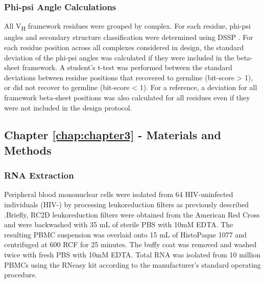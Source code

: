 \subsubsection{Phi-psi Angle Calculations}
All V\textsubscript{H} framework residues were grouped by complex. For each residue, phi-psi angles and secondary structure classification were determined using DSSP \citep{Kabsch:1983bp}. For each residue position across all complexes considered in design, the standard deviation of the phi-psi angles was calculated if they were included in the beta-sheet framework. A student's t-test was performed between the standard deviations between residue positions that recovered to germline (bit-score > 1), or did not recover to germline (bit-score < 1). For a reference, a deviation for all framework beta-sheet positions was also calculated for all residues even if they were not included in the design protocol.
\clearpage
\subsection{Chapter \ref{chap:chapter3} - Materials and Methods}
\par\vspace{10pt}
\subsubsection{RNA Extraction}
Peripheral blood mononuclear cells were isolated from 64 HIV-uninfected individuals (HIV-\naive) by processing leukoreduction filters as previously described \citep{Weitkamp:2001vm} .Briefly, RC2D leukoreduction filters were obtained from the American Red Cross and were backwashed with 35 mL of sterile PBS with 10mM EDTA. The resulting PBMC suspension was overlaid onto 15 mL of HistoPaque 1077 and centrifuged at 600 RCF for 25 minutes. The buffy coat was removed and washed twice with fresh PBS with 10mM EDTA. Total RNA was isolated from 10 million PBMCs using the RNeasy kit according to the manufacturer's standard operating procedure.

